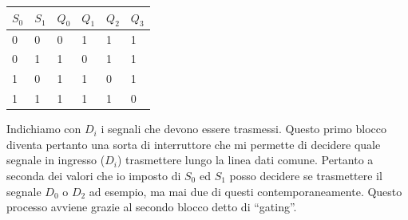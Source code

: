 \begin{center}
	\begin{tabular}{ll|llll}
	\toprule
		$S_0$ & $S_1$ & $Q_0$ & $Q_1$ & $Q_2$ & $Q_3$ \\
	\midrule
		0 & 0 & 0 & 1 & 1 & 1 \\
		0 & 1 & 1 & 0 & 1 & 1 \\
		1 & 0 & 1 & 1 & 0 & 1 \\
		1 & 1 & 1 & 1 & 1 & 0 \\
	\bottomrule
	\end{tabular}
\end{center}

Indichiamo con $D_i$ i segnali che devono essere trasmessi. Questo primo blocco diventa pertanto una sorta di interruttore che mi permette di decidere quale segnale in ingresso ($D_i$) trasmettere lungo la linea dati comune. Pertanto a seconda dei valori che io imposto di $S_0$ ed $S_1$ posso decidere se trasmettere il segnale $D_0$ o $D_2$ ad esempio, ma mai due di questi contemporaneamente. Questo processo avviene grazie al secondo blocco detto di ``gating''.

